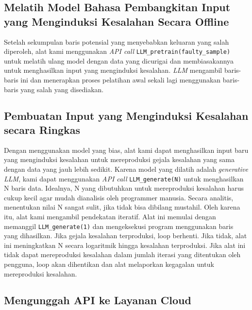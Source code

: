 \subsection{Melatih Model Bahasa Pembangkitan Input yang Menginduksi Kesalahan Secara Offline}
\label{sec:melatih model}

Setelah sekumpulan baris potensial yang menyebabkan keluaran 
yang salah diperoleh, alat kami menggunakan \emph{API call} 
{\tt LLM\_pretrain(faulty\_sample)} untuk melatih ulang model 
dengan data yang dicurigai dan membiasakannya untuk 
menghasilkan input yang menginduksi kesalahan. \emph{LLM} 
mengambil baris-baris ini dan menerapkan proses pelatihan 
awal sekali lagi menggunakan baris-baris yang salah yang 
disediakan.

\subsection{Pembuatan Input yang Menginduksi Kesalahan secara Ringkas}
\label{sec:pembuatan input}

Dengan menggunakan model yang bias, alat kami dapat 
menghasilkan input baru yang menginduksi kesalahan untuk 
mereproduksi gejala kesalahan yang sama dengan data yang 
jauh lebih sedikit. Karena model yang dilatih adalah 
\emph{generative LLM}, kami dapat menggunakan 
\emph{API call} {\tt LLM\_generate(N)} untuk menghasilkan 
N baris data. Idealnya, N yang dibutuhkan untuk mereproduksi 
kesalahan harus cukup kecil agar mudah dianalisis oleh 
programmer manusia. Secara analitis, menentukan nilai N 
sangat sulit, jika tidak bisa dibilang mustahil. Oleh 
karena itu, alat kami mengambil pendekatan iteratif. 
Alat ini memulai dengan memanggil {\tt LLM\_generate(1)} 
dan mengeksekusi program menggunakan baris yang dihasilkan. 
Jika gejala kesalahan terproduksi, loop berhenti. Jika tidak, 
alat ini meningkatkan N secara logaritmik hingga kesalahan 
terproduksi. Jika alat ini tidak dapat mereproduksi kesalahan 
dalam jumlah iterasi yang ditentukan oleh pengguna, loop akan 
dihentikan dan alat melaporkan kegagalan untuk mereproduksi 
kesalahan.

\subsection{Mengunggah API ke Layanan Cloud}
\label{sec:mengunggah api}

